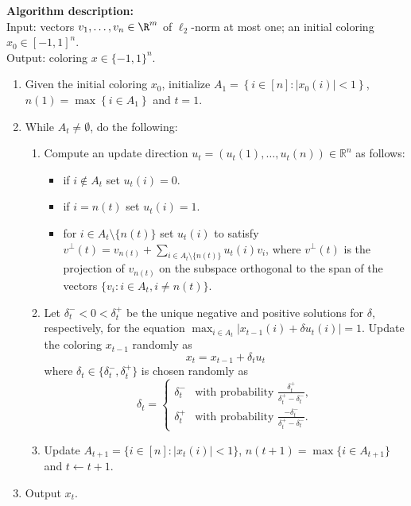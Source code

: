 \documentclass{toc}
\newcommand{\set}[1]{\left\{ #1 \right\}}
\begin{document}
\begin{tcolorbox}
\textbf{Algorithm description:}\\
Input: vectors $v_1,\ldots,v_n \in \R^m$ of $\ell_2$-norm at most one; an initial coloring $x_0 \in [-1,1]^n$.\\
Output: coloring $x \in \{-1,1\}^n$.
\begin{enumerate}
\item Given the initial coloring $x_0$, initialize $A_1 = \set{i \in [n]: |x_0(i)| < 1}$, $n(1) = \max \set{i \in A_1}$ and $t=1$.
\item While $A_t \neq \emptyset$, do the following:
\begin{enumerate}
\item Compute an update direction $u_t=(u_t(1),\ldots,u_t(n)) \in \mathbb{R}^n$ as follows:
\begin{itemize}
\item if $i \notin A_t$ set $u_t(i)=0$.
\item if $i=n(t)$ set $u_t(i)=1$.
\item for $i \in A_t \setminus \{n(t)\}$ set $u_t(i)$ to satisfy $v^\perp(t)=v_{n(t)}+\sum_{i \in A_t \setminus \{n(t)\}}  u_t(i) v_i$,
 where $v^{\perp}(t)$ is the projection of $v_{n(t)}$ on the subspace orthogonal to the span
of the vectors $\{v_i: i\in A_t, i\neq n(t)\}$.
\end{itemize}
\item Let $\delta^{-}_t <0< \delta^{+}_t$ be the unique negative and positive
solutions for $\delta$, respectively, for the equation
$\max_{i \in A_t} |x_{t-1}(i) + \delta u_t(i)| = 1$.
Update the coloring $x_{t-1}$ randomly as
\[ x_t = x_{t-1} + \delta_t u_t \]
where $\delta_t \in \{\delta^{-}_t,\delta^{+}_t\}$ is chosen randomly as
\[
\delta_t =
\begin{cases}
\delta^{-}_t & \text{with probability } \frac{ \delta^{+}_t}{ \delta^{+}_t -  \delta^{-}_t},\\
\delta^{+}_t & \text{with probability } \frac{ -\delta^{-}_t}{ \delta^{+}_t -  \delta^{-}_t}.
\end{cases}
\]
\item Update $A_{t+1} = \{i \in [n]: |x_t(i)| < 1\}$, $n(t+1) = \max \{i \in
A_{t+1}\}$ and $t \leftarrow t+1$.
\end{enumerate}
\item Output $x_t$.
\end{enumerate}
\end{tcolorbox}
\end{document}
